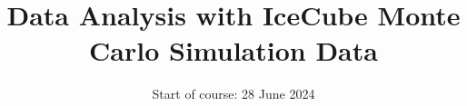 

\title{Data Analysis with IceCube Monte Carlo Simulation Data}
\date{%
  Start of course: 28 June 2024
}



\DeclareSIUnit\eVperc{\eV\per\clight}
\DeclareSIUnit{}


\maketitle
\thispagestyle{empty}
\tableofcontents
\newpage






\printbibliography{}

% 


